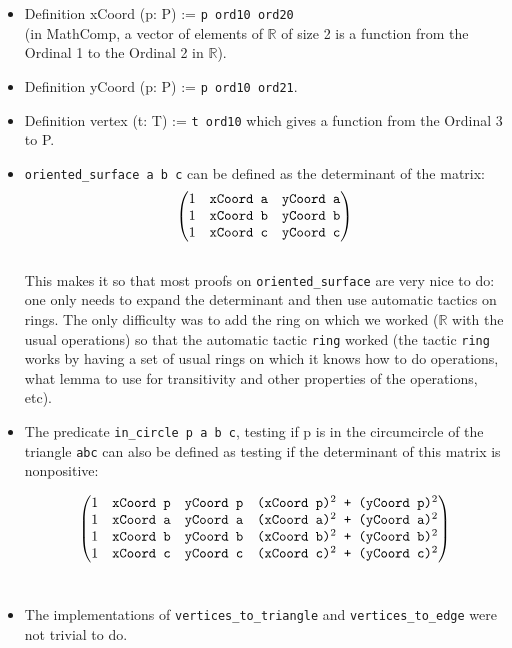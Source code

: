 \documentclass[a4paper,10pt]{article}
\def\definition#1#2{{\color{purple}Definition} {\color{blue}#1} := {\tt #2}}
\begin{document}
 \begin{itemize}
  \item \definition{xCoord (p: P)}{p ord10 ord20} \\(in {\sc MathComp}, a vector of elements of $\mathbb{R}$ of size 2 is a function from the Ordinal 1 to the Ordinal 2 in $\mathbb{R}$). 
  \item \definition{yCoord (p: P)}{p ord10 ord21}.
   \item \definition{vertex (t: T)}{t ord10} which gives a function from the Ordinal 3 to P.
\item {\tt oriented\_surface a b c} \label{oriented_surface} can be defined as the determinant of the matrix:
  $$ \left( \begin{matrix}
1 & \text{{\tt xCoord  a}} & \text{{\tt yCoord  a}}\\
1 & \text{{\tt xCoord  b}} & \text{{\tt yCoord  b}}\\
1 & \text{{\tt xCoord  c}} & \text{{\tt yCoord  c}}
\end{matrix} \right) $$\\
This makes it so that most proofs on {\tt oriented\_surface} are very nice to do: one only needs to expand the determinant and then use automatic tactics on rings. The only difficulty was to add the ring on which we worked ($\mathbb{R}$ with the usual operations) so that the automatic tactic {\tt ring} worked (the tactic {\tt ring} works by having a set of usual rings on which it knows how to do operations, what lemma to use for transitivity and other properties of the operations, etc).

\item The predicate {\tt in\_circle p a b c}, testing if p is in the circumcircle of the triangle {\tt abc} can also be defined as testing if the determinant of this matrix is nonpositive:

  $$\left( \begin{matrix}
1 & \text{{\tt xCoord  p}} & \text{{\tt yCoord  p}}& \text{{\tt (xCoord  p)$^2$ + (yCoord  p)$^2$}}\\
1 & \text{{\tt xCoord  a}} & \text{{\tt yCoord  a}}& \text{{\tt (xCoord  a)$^2$ + (yCoord  a)$^2$}}\\
1 & \text{{\tt xCoord  b}} & \text{{\tt yCoord  b}}& \text{{\tt (xCoord  b)$^2$ + (yCoord  b)$^2$}}\\
1 & \text{{\tt xCoord  c}} & \text{{\tt yCoord  c}}& \text{{\tt (xCoord  c)$^2$ + (yCoord  c)$^2$}}
\end{matrix} \right) $$\\
\item The implementations of {\tt vertices\_to\_triangle} and {\tt vertices\_to\_edge} were not trivial to do.


\end{itemize}
\end{document}
